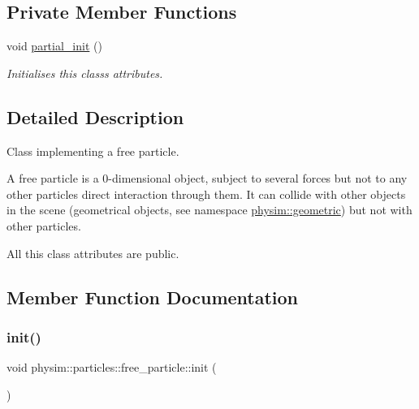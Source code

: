 \subsection*{Private Member Functions}
\begin{DoxyCompactItemize}
\item 
void \hyperlink{classphysim_1_1particles_1_1free__particle_a967f3229ac014999de8f9823882c60e8}{partial\+\_\+init} ()
\begin{DoxyCompactList}\small\item\em Initialises this class\textquotesingle{}s attributes. \end{DoxyCompactList}\end{DoxyCompactItemize}


\subsection{Detailed Description}
Class implementing a free particle. 

A free particle is a 0-\/dimensional object, subject to several forces but not to any other particle\textquotesingle{}s direct interaction through them. It can collide with other objects in the scene (geometrical objects, see namespace \hyperlink{namespacephysim_1_1geometric}{physim\+::geometric}) but not with other particles.

All this class\textquotesingle{} attributes are public. 

\subsection{Member Function Documentation}
\mbox{\label{classphysim_1_1particles_1_1free__particle_a0df21e64a28c5fdf471d54a50b59fea3}} 
\subsubsection{\texorpdfstring{init()}{init()}}
{\footnotesize\ttfamily void physim\+::particles\+::free\+\_\+particle\+::init (\begin{DoxyParamCaption}{ }\end{DoxyParamCaption})\hspace{0.3cm}{\ttfamily [virtual]}}




